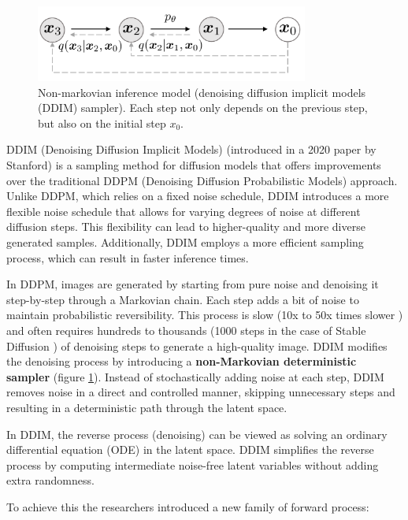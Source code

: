 \begin{figure}
    \centering
    \includegraphics[width=0.8\textwidth]{images/diffusion_models/stable_diffusion/ddim_non_markov_process.png}
    \caption{Non-markovian inference model \cite{ddim} (denoising diffusion implicit models (DDIM) sampler). Each step not only depends on the previous step, but also on the initial step $x_0$.}
    \label{fig:ddim_non_markov_process}
\end{figure}

DDIM (Denoising Diffusion Implicit Models) (introduced in a 2020 paper by Stanford) \cite{ddim} is a sampling method for diffusion models that offers improvements over the traditional DDPM (Denoising Diffusion Probabilistic Models) \cite{ddpm} approach. Unlike DDPM, which relies on a fixed noise schedule, DDIM introduces a more flexible noise schedule that allows for varying degrees of noise at different diffusion steps. This flexibility can lead to higher-quality and more diverse generated samples. Additionally, DDIM employs a more efficient sampling process, which can result in faster inference times.

In DDPM, images are generated by starting from pure noise and denoising it step-by-step through a Markovian chain. Each step adds a bit of noise to maintain probabilistic reversibility. This process is slow (10x to 50x times slower \cite{ddim}) and often requires hundreds to thousands (1000 steps in the case of Stable Diffusion \cite{stable_diffusion}) of denoising steps to generate a high-quality image. DDIM modifies the denoising process by introducing a \textbf{non-Markovian deterministic sampler} (figure \ref{fig:ddim_non_markov_process}). Instead of stochastically adding noise at each step, DDIM removes noise in a direct and controlled manner, skipping unnecessary steps and resulting in a deterministic path through the latent space.

In DDIM, the reverse process (denoising) can be viewed as solving an ordinary differential equation (ODE) in the latent space. DDIM simplifies the reverse process by computing intermediate noise-free latent variables without adding extra randomness.

To achieve this the researchers introduced a new family of forward process:

